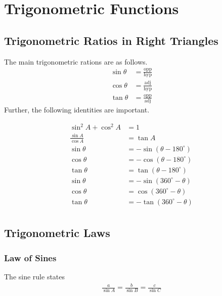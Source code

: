 \section{Trigonometric Functions}

\subsection{Trigonometric Ratios in Right Triangles}
The main trigonometric rations are as follows.
\begin{align} \sin \theta &=\frac{\mathrm{opp}}{\mathrm{hyp}} \\ \cos \theta &=\frac{\mathrm{adj}}{\mathrm{hyp}} \\ \tan \theta &=\frac{\mathrm{opp}}{\mathrm{adj}} \end{align}
Further, the following identities are important.

\begin{align}
	\sin ^{2} A+\cos ^{2} A & =1                                     \\
	\frac{\sin A}{\cos A}   & =\tan A                                \\
	\sin \theta             & =-\sin \left(\theta-180^{\circ}\right) \\
	\cos \theta             & =-\cos \left(\theta-180^{\circ}\right) \\
	\tan \theta             & =\tan \left(\theta-180^{\circ}\right)  \\
	\sin \theta             & =-\sin \left(360^{\circ}-\theta\right) \\
	\cos \theta             & =\cos \left(360^{\circ}-\theta\right)  \\
	\tan \theta             & =-\tan \left(360^{\circ}-\theta\right) \\
\end{align}

\subsection{Trigonometric Laws}

\subsubsection{Law of Sines}

The sine rule states
\begin{align}
	\frac{a}{\sin A}=\frac{b}{\sin B}=\frac{c}{\sin C}
\end{align}

